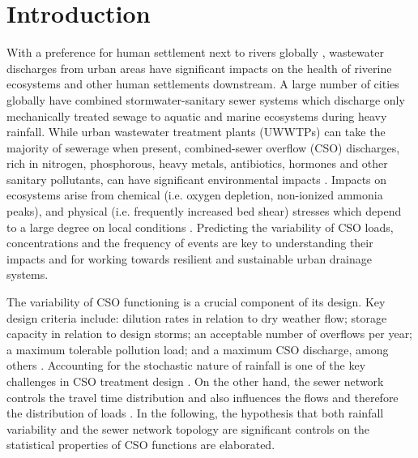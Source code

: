 \documentclass[draft,linenumbers]{agujournal2018}
\providecommand{\DIFaddbegin}{} %
\providecommand{\DIFaddend}{} %
\providecommand{\DIFdelbegin}{} %
\providecommand{\DIFdelend}{} %
\begin{document}
\section{Introduction}
With a preference for human settlement next to rivers globally \citep{Fang_2018}, wastewater discharges from urban areas have signif\/icant impacts on the health of riverine ecosystems and other human settlements downstream. A large number of cities globally have combined stormwater-sanitary sewer systems which discharge only mechanically treated sewage to aquatic and marine ecosystems during heavy rainfall. While urban wastewater treatment plants (UWWTPs) can take the majority of sewerage when present, combined-sewer overf\/low (CSO) discharges, rich in nitrogen, phosphorous, heavy metals, antibiotics, hormones and other sanitary pollutants, can have signif\/icant environmental impacts  \DIFdelbegin %
\DIFdelend \DIFaddbegin \citep{David_2013,Phillips_2012}\DIFaddend . Impacts on ecosystems arise from chemical (i.e. oxygen depletion, non-ionized ammonia peaks), and physical  (i.e. frequently increased bed shear) stresses which  depend to a large degree on local conditions \citep{borchardt1997urban}. Predicting the variability of CSO loads, concentrations and the frequency of events are key to understanding their impacts and for working towards resilient and sustainable urban drainage systems.

The variability of CSO functioning is a crucial component of its design. Key design criteria include: dilution rates in relation to dry weather f\/low; storage capacity in relation to design storms; an acceptable number of overf\/lows per year; a maximum tolerable pollution load; and a maximum CSO discharge, among others \citep{Riechel_2016}. Accounting for the stochastic nature of rainfall is one of the key challenges in CSO treatment design \citep{Geiger_1998}. On the other hand, the sewer network controls the travel time distribution and also inf\/luences the f\/lows and therefore the distribution of loads \citep{LHOMME_2004}. In the following, the hypothesis that both rainfall variability and the sewer network topology are signif\/icant controls on the statistical properties of CSO functions are elaborated.
\end{document}
